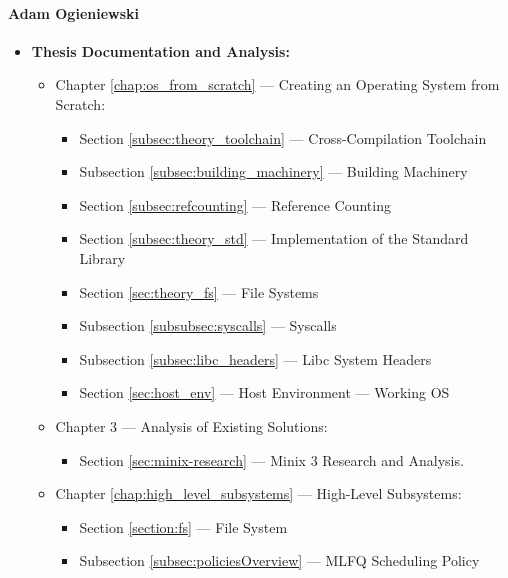 \documentclass[a4paper,10pt,twoside]{report}
\theoremstyle{definition}
\begin{document}
\paragraph{Adam Ogieniewski}

\begin{itemize} 
    \item \textbf{Thesis Documentation and Analysis:}
    \begin{itemize}
        \item Chapter \ref{chap:os_from_scratch} --- Creating an Operating System from Scratch:
        \begin{itemize}
            \item Section \ref{subsec:theory_toolchain} --- Cross-Compilation Toolchain
            \item Subsection \ref{subsec:building_machinery} --- Building Machinery
            \item Section \ref{subsec:refcounting} --- Reference Counting
            \item Section \ref{subsec:theory_std} --- Implementation of the Standard Library
            \item Section \ref{sec:theory_fs} --- File Systems
            \item Subsection \ref{subsubsec:syscalls} --- Syscalls
            \item Subsection \ref{subsec:libc_headers} --- Libc System Headers
            \item Section \ref{sec:host_env} --- Host Environment --- Working OS
        \end{itemize}

        \item Chapter 3 --- Analysis of Existing Solutions:
        \begin{itemize}
            \item Section \ref{sec:minix-research} --- Minix 3 Research and Analysis.
        \end{itemize}

        \item Chapter \ref{chap:high_level_subsystems} --- High-Level Subsystems:
        \begin{itemize}
            \item Section \ref{section:fs} --- File System
            \item Subsection \ref{subsec:policiesOverview} --- MLFQ Scheduling Policy
        \end{itemize}


\end{itemize}
\end{itemize}
\end{document}
